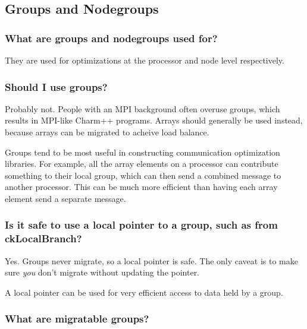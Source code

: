 \subsection{\charmpp{} Groups and Nodegroups}

\subsubsection{What are groups and nodegroups used for?}

They are used for optimizations at the processor and node level respectively.

\subsubsection{Should I use groups?}

Probably not. People with an MPI background often overuse groups, which
results in MPI-like Charm++ programs. Arrays should generally be used
instead, because arrays can be migrated to acheive load balance.

Groups tend to be most useful in constructing communication optimization
libraries. For example, all the array elements on a processor can
contribute something to their local group, which can then send a combined
message to another processor. This can be much more efficient than
having each array element send a separate message.

\subsubsection{Is it safe to use a local pointer to a group, such as from ckLocalBranch?}

Yes. Groups never migrate, so a local pointer is safe. The only caveat
is to make sure {\em you} don't migrate without updating the pointer.

A local pointer can be used for very efficient access to data held by
a group.




\subsubsection{What are migratable groups?}

